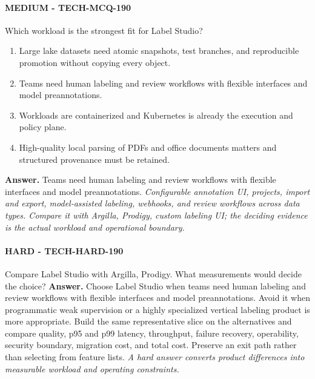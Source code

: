 \paragraph{MEDIUM - TECH-MCQ-190} Which workload is the strongest fit for Label Studio?
\begin{enumerate}[label=\Alph*.]
\item Large lake datasets need atomic snapshots, test branches, and reproducible promotion without copying every object.
\item Teams need human labeling and review workflows with flexible interfaces and model preannotations.
\item Workloads are containerized and Kubernetes is already the execution and policy plane.
\item High-quality local parsing of PDFs and office documents matters and structured provenance must be retained.
\end{enumerate}
\textbf{Answer.} Teams need human labeling and review workflows with flexible interfaces and model preannotations.
\textit{Configurable annotation UI, projects, import and export, model-assisted labeling, webhooks, and review workflows across data types. Compare it with Argilla, Prodigy, custom labeling UI; the deciding evidence is the actual workload and operational boundary.}
\paragraph{HARD - TECH-HARD-190} Compare Label Studio with Argilla, Prodigy. What measurements would decide the choice?
\textbf{Answer.} Choose Label Studio when teams need human labeling and review workflows with flexible interfaces and model preannotations. Avoid it when programmatic weak supervision or a highly specialized vertical labeling product is more appropriate. Build the same representative slice on the alternatives and compare quality, p95 and p99 latency, throughput, failure recovery, operability, security boundary, migration cost, and total cost. Preserve an exit path rather than selecting from feature lists.
\textit{A hard answer converts product differences into measurable workload and operating constraints.}
